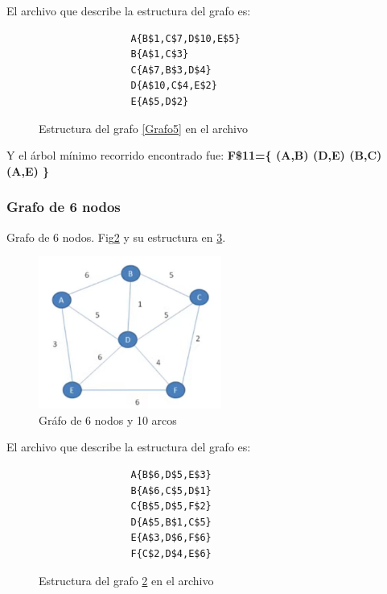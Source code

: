         El archivo que describe la estructura del grafo es:
        \begin{figure}[h!]
            \centering
            \begin{verbatim}
                A{B$1,C$7,D$10,E$5}
                B{A$1,C$3}
                C{A$7,B$3,D$4}
                D{A$10,C$4,E$2}
                E{A$5,D$2}\end{verbatim}
            \caption{Estructura del grafo \ref{Grafo5} en el archivo}
            \label{ArchivoGrafo5}
        \end{figure} 
        
        Y el árbol mínimo recorrido encontrado fue: \textbf{F\$11=\{ (A,B)  (D,E)  (B,C)  (A,E) \}}
        
        \subsubsection*{Grafo de 6 nodos}
        Grafo de 6 nodos. Fig\ref{Grafo6} y su estructura en \ref{ArchivoGrafo6}.
        
        \begin{figure}[h!]
            \centering
            \includegraphics[width=6cm]{Kruskal/Grafo6.png}
            \caption{Gráfo de 6 nodos y 10 arcos}
            \label{Grafo6}
        \end{figure}
            
        El archivo que describe la estructura del grafo es:
        \begin{figure}[h!]
            \centering
            \begin{verbatim}
                A{B$6,D$5,E$3}
                B{A$6,C$5,D$1}
                C{B$5,D$5,F$2}
                D{A$5,B$1,C$5}
                E{A$3,D$6,F$6}
                F{C$2,D$4,E$6}\end{verbatim}
            \caption{Estructura del grafo \ref{Grafo6} en el archivo}
            \label{ArchivoGrafo6}
        \end{figure} 
        
